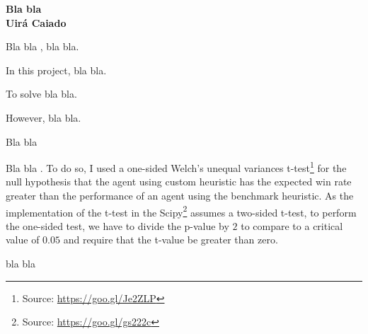 \documentclass[a4paper]{article}
\begin{document}

\begin{center}

{\bf \large Bla bla \\ \small Uirá Caiado}
\end{center}



Bla bla \cite{Economist2017}, bla bla.

In this project, bla bla.

To solve bla bla.

However, bla bla.



Bla bla







Bla bla . To do so, I used a one-sided Welch's unequal variances t-test\footnote{Source: \url{https://goo.gl/Je2ZLP}} for the null hypothesis that the agent using custom heuristic has the expected win rate greater than the performance of an agent using the benchmark heuristic. As the implementation of the t-test in the Scipy\footnote{Source: \url{https://goo.gl/gs222c}} assumes a two-sided t-test, to perform the one-sided test, we have to divide the p-value by $2$ to compare to a critical value of $0.05$ and require that the t-value be greater than zero.



bla bla




























\end{document}
